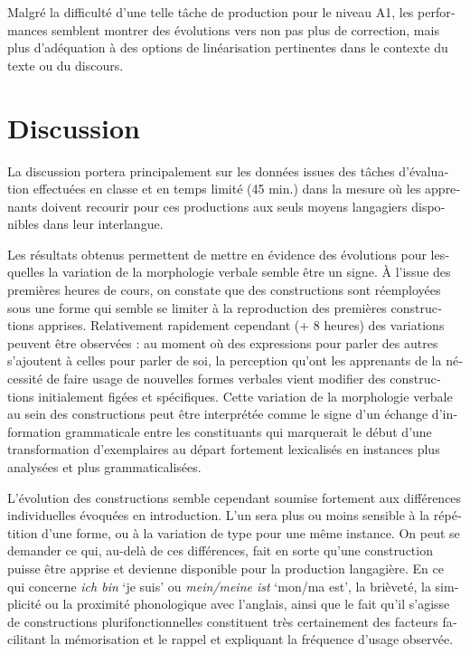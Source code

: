 \documentclass[output=paper]{langscibook}
\begin{document}
\begin{otherlanguage}{french}
\ea%
    \label{ex:felce:17}

    \z
\z

Malgré la difficulté d’une telle tâche de production pour le niveau A1, les performances semblent montrer des évolutions vers non pas plus de correction, mais plus d’adéquation à des options de linéarisation pertinentes dans le contexte du texte ou du discours.

\section{Discussion}\label{sec:felce:7}

La discussion portera principalement sur les données issues des tâches d’évaluation effectuées en classe et en temps limité (45 min.) dans la mesure où les apprenants doivent recourir pour ces productions aux seuls moyens langagiers disponibles dans leur interlangue.

Les résultats obtenus permettent de mettre en évidence des évolutions pour lesquelles la variation de la morphologie verbale semble être un signe. À l’issue des premières heures de cours, on constate que des constructions sont réemployées sous une forme qui semble se limiter à la reproduction des premières constructions apprises. Relativement rapidement cependant (+ 8 heures) des variations peuvent être observées : au moment où des expressions pour parler des autres s’ajoutent à celles pour parler de soi, la perception qu’ont les apprenants de la nécessité de faire usage de nouvelles formes verbales vient modifier des constructions initialement figées et spécifiques. Cette variation de la morphologie verbale au sein des constructions peut être interprétée comme le signe d’un échange d’information grammaticale entre les constituants qui marquerait le début d’une transformation d’exemplaires au départ fortement lexicalisés en instances plus analysées et plus grammaticalisées. 

L’évolution des constructions semble cependant soumise fortement aux différences individuelles évoquées en introduction. L’un sera plus ou moins sensible à la répétition d’une forme, ou à la variation de type pour une même instance. On peut se demander ce qui, au-delà de ces différences, fait en sorte qu’une construction puisse être apprise et devienne disponible pour la production langagière. En ce qui concerne \textit{ich bin} `je suis' ou \textit{mein/meine ist} `mon/ma est', la brièveté, la simplicité ou la proximité phonologique avec l’anglais, ainsi que le fait qu’il s’agisse de constructions plurifonctionnelles constituent très certainement des facteurs facilitant la mémorisation et le rappel et expliquant la fréquence d’usage observée.


\end{otherlanguage}
\end{document}

